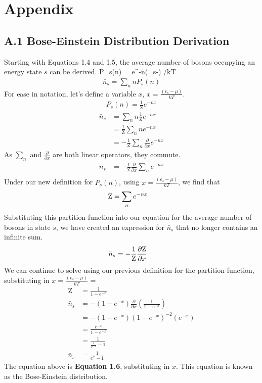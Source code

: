 \chapter*{Appendix}
\section*{A.1 Bose-Einstein Distribution Derivation}
Starting with Equations 1.4 and 1.5, the average number of bosons occupying an energy state $s$ can be derived. 
\beq
P_s(n) =  e^{-n(\epsilon_s-\mu) /kT}
\eeq
\beq
{}= 
\eeq
\begin{align*}
    \bar{n}_s = \sum_n{nP_s(n)} 
\end{align*}
For ease in notation, let's define a variable $x$, $x = \frac{(\epsilon_s-\mu) }{kT}$.
\begin{align*}
P_s(n) = \frac{1}{\mathrm{Z}} e^{-nx} 
\end{align*}
\begin{align*}
\bar{n}_s &= \sum_n{n\frac{1}{\mathrm{Z}} e^{-nx}}  \\
&= \frac{1}{\mathrm{Z}} \sum_n{ne^{-nx}} \\
&= -\frac{1}{\mathrm{Z}} \sum_n{\frac{\partial}{\partial x}e^{-nx}}
\end{align*}
As $\sum_n{}$ and $\frac{\partial}{\partial x}$ are both linear operators, they commute.
\begin{align*}
\bar{n}_s &=-\frac{1}{\mathrm{Z}} \frac{\partial}{\partial x}\sum_n{e^{-nx}} \\
\end{align*}
Under our new definition for $P_s(n)$, using $x= \frac{(\epsilon_s-\mu) }{kT}$, we find that 
\begin{align*}
    \mathrm{Z} &= \sum_n{e^{-nx}}
\end{align*}
Substituting this partition function into our equation for the average number of bosons in state $s$, we have created an expression for $\bar{n}_s$ that no longer contains an infinite sum. 
\begin{align*}
    \bar{n}_s &=-\frac{1}{\mathrm{Z}} \frac{\partial \mathrm{Z}}{\partial x}
\end{align*}
We can continue to solve using our previous definition for the partition function, substituting in $x = \frac{(\epsilon_s-\mu) }{kT}$
\beq
{}= 
\eeq
\begin{align*}
    \mathrm{Z}&= \frac{1}{1- e^{-x}}\\
    \bar{n}_s &=-(1- e^{-x}) \frac{\partial }{\partial x}\left( \frac{1}{1- e^{-x}}\right) \\
    &= -(1- e^{-x}) (1- e^{-x})^{-2}(e^{-x})\\
    &= \frac{e^{-x}}{1-e^{-x}} \\
    &= \frac{1}{\frac{1}{e^{-x}}-1} \\
    \bar{n}_s  &= \frac{1}{e^x-1}\tag{1.6}
\end{align*}
The equation above is \textbf{Equation 1.6}, substituting in $x$. This equation is known as the Bose-Einstein distribution. 
\newpage

